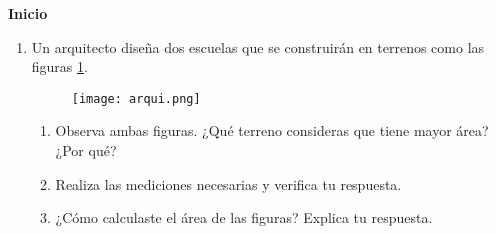 \begin{boxK}
    \begin{center}\textbf{Inicio}\end{center}

    \begin{enumerate}
        \item Un arquitecto diseña dos escuelas que se construirán en terrenos como las figuras \ref{fig:arqui}.
              \begin{figure}[H]
                  \centering
                  \texttt{[image: arqui.png]}
                  \label{fig:arqui}
              \end{figure}
              \begin{enumerate}
                  \item Observa ambas figuras. ¿Qué terreno consideras que tiene mayor área? ¿Por qué?
                  \item Realiza las mediciones necesarias y verifica tu respuesta.
                  \item ¿Cómo calculaste el área de las figuras? Explica tu respuesta.
              \end{enumerate}
    \end{enumerate}
\end{boxK}















\newpage